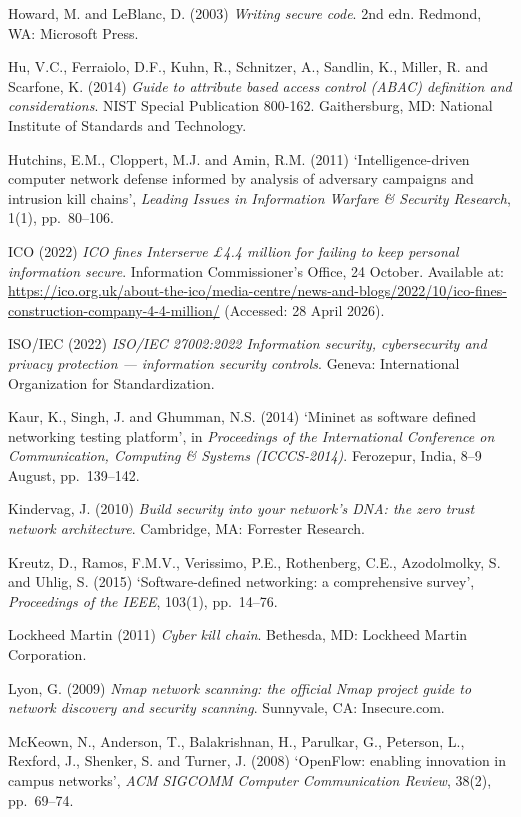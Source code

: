 Howard, M. and LeBlanc, D. (2003) \textit{Writing secure code}. 2nd edn. Redmond, WA: Microsoft Press.

Hu, V.C., Ferraiolo, D.F., Kuhn, R., Schnitzer, A., Sandlin, K., Miller, R. and Scarfone, K. (2014) \textit{Guide to attribute based access control (ABAC) definition and considerations}. NIST Special Publication 800-162. Gaithersburg, MD: National Institute of Standards and Technology.

Hutchins, E.M., Cloppert, M.J. and Amin, R.M. (2011) `Intelligence-driven computer network defense informed by analysis of adversary campaigns and intrusion kill chains', \textit{Leading Issues in Information Warfare \& Security Research}, 1(1), pp.~80--106.

ICO (2022) \textit{ICO fines Interserve \pounds4.4 million for failing to keep personal information secure}. Information Commissioner's Office, 24 October. Available at: \url{https://ico.org.uk/about-the-ico/media-centre/news-and-blogs/2022/10/ico-fines-construction-company-4-4-million/} (Accessed: 28 April 2026).

ISO/IEC (2022) \textit{ISO/IEC 27002:2022 Information security, cybersecurity and privacy protection --- information security controls}. Geneva: International Organization for Standardization.

Kaur, K., Singh, J. and Ghumman, N.S. (2014) `Mininet as software defined networking testing platform', in \textit{Proceedings of the International Conference on Communication, Computing \& Systems (ICCCS-2014)}. Ferozepur, India, 8--9 August, pp.~139--142.

Kindervag, J. (2010) \textit{Build security into your network's DNA: the zero trust network architecture}. Cambridge, MA: Forrester Research.

Kreutz, D., Ramos, F.M.V., Verissimo, P.E., Rothenberg, C.E., Azodolmolky, S. and Uhlig, S. (2015) `Software-defined networking: a comprehensive survey', \textit{Proceedings of the IEEE}, 103(1), pp.~14--76.

Lockheed Martin (2011) \textit{Cyber kill chain}. Bethesda, MD: Lockheed Martin Corporation.

Lyon, G. (2009) \textit{Nmap network scanning: the official Nmap project guide to network discovery and security scanning}. Sunnyvale, CA: Insecure.com.

McKeown, N., Anderson, T., Balakrishnan, H., Parulkar, G., Peterson, L., Rexford, J., Shenker, S. and Turner, J. (2008) `OpenFlow: enabling innovation in campus networks', \textit{ACM SIGCOMM Computer Communication Review}, 38(2), pp.~69--74.

